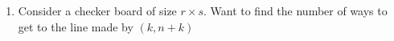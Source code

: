 \documentclass[10pt]{article}
\begin{document}
\begin{enumerate}[label= (Q-\arabic*)]
    \item Consider a checker board of size $r\times s$. Want to find the number of ways to get to the line made by $(k,n+k)$
\end{enumerate}
\end{document}
